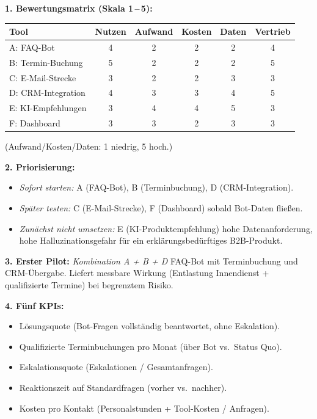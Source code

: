 \documentclass[11pt,a4paper,oneside]{article}
\begin{document}
\begin{loesungbox}
\textbf{1. Bewertungsmatrix (Skala 1\,--\,5):}

\smallskip
\begin{tabularx}{\linewidth}{@{}lccccc@{}}
\toprule
\textbf{Tool} & \textbf{Nutzen} & \textbf{Aufwand} & \textbf{Kosten} & \textbf{Daten} & \textbf{Vertrieb} \\
\midrule
A: FAQ-Bot          & 4 & 2 & 2 & 2 & 4 \\
B: Termin-Buchung   & 5 & 2 & 2 & 2 & 5 \\
C: E-Mail-Strecke   & 3 & 2 & 2 & 3 & 3 \\
D: CRM-Integration  & 4 & 3 & 3 & 4 & 5 \\
E: KI-Empfehlungen  & 3 & 4 & 4 & 5 & 3 \\
F: Dashboard        & 3 & 3 & 2 & 3 & 3 \\
\bottomrule
\end{tabularx}

\smallskip
(Aufwand/Kosten/Daten: 1 niedrig, 5 hoch.)

\smallskip
\textbf{2. Priorisierung:}
\begin{itemize}
  \item \emph{Sofort starten:} A (FAQ-Bot), B (Terminbuchung), D (CRM-Integration).
  \item \emph{Später testen:} C (E-Mail-Strecke), F (Dashboard) \textendash{} sobald Bot-Daten fließen.
  \item \emph{Zunächst nicht umsetzen:} E (KI-Produktempfehlung) \textendash{} hohe Datenanforderung, hohe Halluzinationsgefahr für ein erklärungsbedürftiges B2B-Produkt.
\end{itemize}

\textbf{3. Erster Pilot:} \emph{Kombination A + B + D} \textendash{} FAQ-Bot mit Terminbuchung und CRM-Übergabe. Liefert messbare Wirkung (Entlastung Innendienst + qualifizierte Termine) bei begrenztem Risiko.

\smallskip
\textbf{4. Fünf KPIs:}
\begin{itemize}
  \item Lösungsquote (Bot-Fragen vollständig beantwortet, ohne Eskalation).
  \item Qualifizierte Terminbuchungen pro Monat (über Bot vs.\ Status Quo).
  \item Eskalationsquote (Eskalationen / Gesamtanfragen).
  \item Reaktionszeit auf Standardfragen (vorher vs.\ nachher).
  \item Kosten pro Kontakt (Personalstunden + Tool-Kosten / Anfragen).
\end{itemize}


\end{loesungbox}
\end{document}
